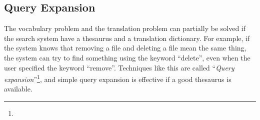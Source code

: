 \documentclass[manuscript,anonymous,review]{acmart}
\begin{document}

\subsection*{Query Expansion}

% 
%

The vocabulary problem and the translation problem can partially be solved
if the search system have a thesaurus and a translation dictionary.
%
For example, 
if the system knows that removing a file and deleting a file mean the same thing,
the system can try to find something using the keyword ``delete'',
even when the user specified the keyword ``remove''.
%
Techniques like this are called ``\textit{Query expansion}''\footnote{
},
and simple query expansion is effective if a good thesaurus is available.

% 
\end{document}
